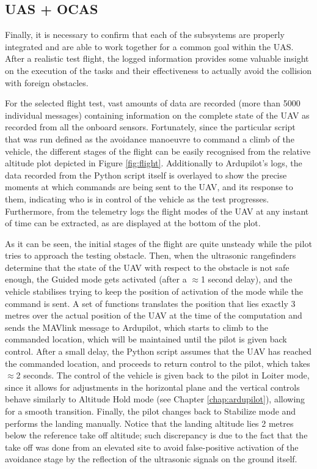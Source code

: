 \subsection{UAS + OCAS}

Finally, it is necessary to confirm that each of the subsystems are properly integrated and are able to work together for a common goal within the UAS.
After a realistic test flight, the logged information provides some valuable insight on the execution of the tasks and their effectiveness to actually avoid the collision with foreign obstacles.

For the selected flight test, vast amounts of data are recorded (more than 5000 individual messages) containing information on the complete state of the UAV as recorded from all the onboard sensors.
Fortunately, since the particular script that was run defined as the avoidance manoeuvre to command a climb of the vehicle, the different stages of the flight can be easily recognised from the relative altitude plot depicted in Figure \ref{fig:flight}.
Additionally to Ardupilot's logs, the data recorded from the Python script itself is overlayed to show the precise moments at which commands are being sent to the UAV, and its response to them, indicating who is in control of the vehicle as the test progresses.
Furthermore, from the telemetry logs the flight modes of the UAV at any instant of time can be extracted, as are displayed at the bottom of the plot.



As it can be seen, the initial stages of the flight are quite unsteady while the pilot tries to approach the testing obstacle.
Then, when the ultrasonic rangefinders determine that the state of the UAV with respect to the obstacle is not safe enough, the Guided mode gets activated (after a $\approx$1 second delay), and the vehicle stabilises trying to keep the position of activation of the mode while the command is sent.
A set of functions translates the position that lies exactly 3 metres over the actual position of the UAV at the time of the computation and sends the MAVlink message to Ardupilot, which starts to climb to the commanded location, which will be maintained until the pilot is given back control.
After a small delay, the Python script assumes that the UAV has reached the commanded location, and proceeds to return control to the pilot, which takes $\approx$2 seconds.
The control of the vehicle is given back to the pilot in Loiter mode, since it allows for adjustments in the horizontal plane and the vertical controls behave similarly to Altitude Hold mode (see Chapter \ref{chap:ardupilot}), allowing for a smooth transition.
Finally, the pilot changes back to Stabilize mode and performs the landing manually.
Notice that the landing altitude lies 2 metres below the reference take off altitude; such discrepancy is due to the fact that the take off was done from an elevated site to avoid false-positive activation of the avoidance stage by the reflection of the ultrasonic signals on the ground itself.

